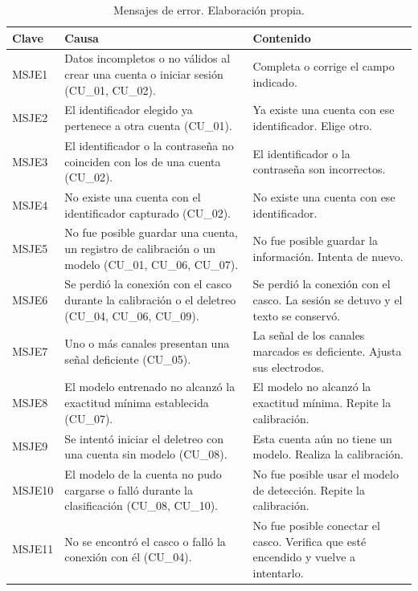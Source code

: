 \begin{table}[H]
\centering
\small
\begin{tabularx}{\textwidth}{|L{1.5cm}|L{5.4cm}|Y|}
\hline
\textbf{Clave} & \textbf{Causa} & \textbf{Contenido} \\
\hline
MSJE1 & Datos incompletos o no válidos al crear una cuenta o iniciar sesión (CU\_01, CU\_02). & Completa o corrige el campo indicado. \\
\hline
MSJE2 & El identificador elegido ya pertenece a otra cuenta (CU\_01). & Ya existe una cuenta con ese identificador. Elige otro. \\
\hline
MSJE3 & El identificador o la contraseña no coinciden con los de una cuenta (CU\_02). & El identificador o la contraseña son incorrectos. \\
\hline
MSJE4 & No existe una cuenta con el identificador capturado (CU\_02). & No existe una cuenta con ese identificador. \\
\hline
MSJE5 & No fue posible guardar una cuenta, un registro de calibración o un modelo (CU\_01, CU\_06, CU\_07). & No fue posible guardar la información. Intenta de nuevo. \\
\hline
MSJE6 & Se perdió la conexión con el casco durante la calibración o el deletreo (CU\_04, CU\_06, CU\_09). & Se perdió la conexión con el casco. La sesión se detuvo y el texto se conservó. \\
\hline
MSJE7 & Uno o más canales presentan una señal deficiente (CU\_05). & La señal de los canales marcados es deficiente. Ajusta sus electrodos. \\
\hline
MSJE8 & El modelo entrenado no alcanzó la exactitud mínima establecida (CU\_07). & El modelo no alcanzó la exactitud mínima. Repite la calibración. \\
\hline
MSJE9 & Se intentó iniciar el deletreo con una cuenta sin modelo (CU\_08). & Esta cuenta aún no tiene un modelo. Realiza la calibración. \\
\hline
MSJE10 & El modelo de la cuenta no pudo cargarse o falló durante la clasificación (CU\_08, CU\_10). & No fue posible usar el modelo de detección. Repite la calibración. \\
\hline
MSJE11 & No se encontró el casco o falló la conexión con él (CU\_04). & No fue posible conectar el casco. Verifica que esté encendido y vuelve a intentarlo. \\
\hline
\end{tabularx}
\caption{Mensajes de error. Elaboración propia.}
\label{tab:msje}
\end{table}


